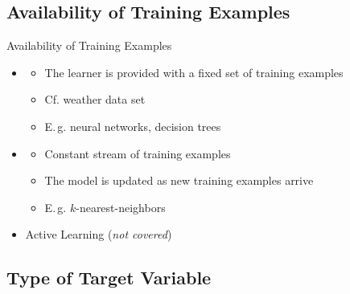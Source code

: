 \subsection{Availability of Training Examples}

\begin{frame}{Availability of Training Examples}{}
	\begin{itemize}
		\item {}
		\begin{itemize}
			\item The learner is provided with a fixed set of training examples
			\item Cf. weather data set
			\item E.\,g. neural networks, decision trees
		\end{itemize}
		\item {}
		\begin{itemize}
			\item Constant stream of training examples
			\item The model is updated as new training examples arrive
			\item E.\,g. $k$-nearest-neighbors
		\end{itemize}
		\item Active Learning (\textit{not covered})
	\end{itemize}
\end{frame}


\subsection{Type of Target Variable}

